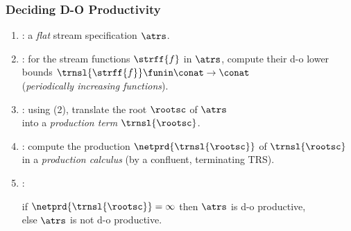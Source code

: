 \documentclass[10pt]{beamer}
\begin{document}


\begin{frame}%
  \frametitle{Deciding D-O Productivity}


  \begin{enumerate}
      \vspace*{1.65ex}
    \item  {}: a \emph{flat} stream specification $\atrs$.
      \vspace*{1.65ex}
    \item  {}:
      for the stream functions $\strff{f}$ in $\atrs$,
      compute their d-o lower bounds
      $\trnsl{\strff{f}} \funin \conat \to \conat$
      \\ \hspace*{\fill}
      (\emph{periodically increasing functions}).
      \vspace*{1.65ex}
    \item  {}: using (2),
      translate the root $\rootsc$ of $\atrs$\\
      into a \emph{production term} $\trnsl{\rootsc}$.
      \vspace*{1.65ex}
    \item  {}:
      compute the production $\netprd{\trnsl{\rootsc}}$ of $\trnsl{\rootsc}$\\
      in a \emph{production calculus} (by a {confluent, terminating TRS}).
      \vspace*{1.65ex}
    \item {}:
      \parbox[t]{200pt}{%
           if $\netprd{\trnsl{\rootsc}}=\infty$
             then $\atrs$ is \alert{d-o productive},\\
             else $\atrs$ is \alert{not d-o productive}.%
                        }
  \end{enumerate}

\end{frame}%
\end{document}
